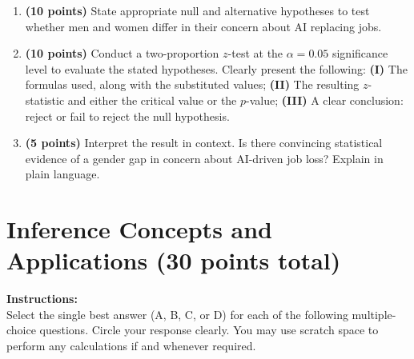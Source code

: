 \documentclass{article}
\newcommand{\blankbox}[2][3cm]{%
    \vspace{-0.5em}
    \begin{figure}[H]
        \makebox[\linewidth]{%
            \begin{tcolorbox}[
                colback=white, 
                colframe=white,  %
                width=#2, %
                height=#1,
                boxrule=0.2mm
            ]
            \end{tcolorbox}
        }
    \end{figure}
    \vspace{-2em}
}
\begin{document}
\begin{enumerate}
    \item \textbf{(10 points)} State appropriate null and alternative hypotheses to test whether men and women differ in their concern about AI replacing jobs.  \blankbox[3cm]{1.0\linewidth}
    \item \textbf{(10 points)} Conduct a two-proportion $z$-test at the $\alpha = 0.05$ significance level to evaluate the stated hypotheses. Clearly present the following: \textbf{(I)} The formulas used, along with the substituted values;  
    \textbf{(II)} The resulting $z$-statistic and either the critical value or the $p$-value;  
    \textbf{(III)} A clear conclusion: reject or fail to reject the null hypothesis.  
    \blankbox[9cm]{1.0\linewidth}

    \item  \textbf{(5 points)}  Interpret the result in context. Is there convincing statistical evidence of a gender gap in concern about AI-driven job loss? Explain in plain language.  \blankbox[6cm]{1.0\linewidth}
\end{enumerate}

\newpage
\section{Inference Concepts and Applications (30 points total)} 
\noindent\textbf{Instructions:} \\
Select the single best answer (A, B, C, or D) for each of the following multiple-choice questions. Circle your response clearly. You may use scratch space to perform any calculations if and whenever required.
\end{document}
